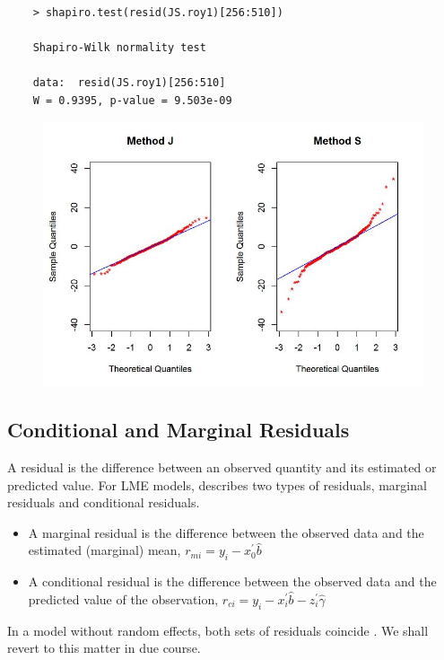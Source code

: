 \documentclass[Main.tex]{subfiles}
\begin{document}
\begin{framed}
	\begin{verbatim}
	> shapiro.test(resid(JS.roy1)[256:510])
	
	Shapiro-Wilk normality test
	
	data:  resid(JS.roy1)[256:510]
	W = 0.9395, p-value = 9.503e-09
	\end{verbatim}
\end{framed}
\begin{figure}[h!]
	\centering
	\includegraphics[width=0.9\linewidth]{images/Resid-newplot2}
	\caption{}
	\label{fig:Resid-newplot2}
\end{figure}

\newpage


\subsection{Conditional and Marginal Residuals}
A residual is the difference between an observed quantity and its estimated or predicted value. For LME models, \citet{schab} describes two types of residuals, marginal residuals and conditional residuals. 

\begin{itemize}
	\item A marginal residual is the difference between the observed data and the estimated (marginal) mean, $r_{mi} = y_i - x_0^{\prime} \hat{b}$
	\item A conditional residual is the difference between the observed data and the predicted value of the observation,
	$r_{ci} = y_i - x_i^{\prime} \hat{b} - z_i^{\prime} \hat{\gamma}$	
\end{itemize} 
In a model without random effects, both sets of
residuals coincide \citep{schab} . We shall revert to this matter in due course.
\end{document}
